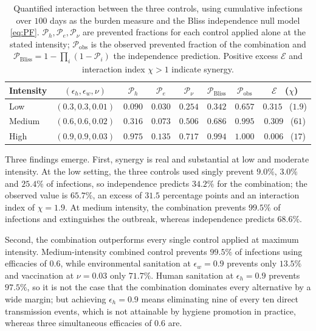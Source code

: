 \documentclass[11pt]{article}
\theoremstyle{plain}
\theoremstyle{definition}
\theoremstyle{remark}
\begin{document}
\begin{table}[!htbp]
\centering
\caption{Quantified interaction between the three controls, using cumulative infections over $100$ days as the burden measure and the Bliss independence null model \eqref{eq:PF}. $\mathcal{P}_h,\mathcal{P}_e,\mathcal{P}_\nu$ are prevented fractions for each control applied alone at the stated intensity; $\mathcal{P}_{\mathrm{obs}}$ is the observed prevented fraction of the combination and $\mathcal{P}_{\mathrm{Bliss}}=1-\prod_i(1-\mathcal{P}_i)$ the independence prediction. Positive excess $\mathcal{E}$ and interaction index $\chi>1$ indicate synergy.}\label{tab:synergy}
\small
\begin{tabular}{@{}lccccccc@{}}
\toprule
Intensity & $(\epsilon_h,\epsilon_w,\nu)$ & $\mathcal{P}_h$ & $\mathcal{P}_e$ & $\mathcal{P}_\nu$ & $\mathcal{P}_{\mathrm{Bliss}}$ & $\mathcal{P}_{\mathrm{obs}}$ & $\mathcal{E}$ \ ($\chi$) \\
\midrule
Low    & $(0.3,0.3,0.01)$ & $0.090$ & $0.030$ & $0.254$ & $0.342$ & $0.657$ & $0.315$ \ ($1.9$) \\
Medium & $(0.6,0.6,0.02)$ & $0.316$ & $0.073$ & $0.506$ & $0.686$ & $0.995$ & $0.309$ \ ($61$) \\
High   & $(0.9,0.9,0.03)$ & $0.975$ & $0.135$ & $0.717$ & $0.994$ & $1.000$ & $0.006$ \ ($17$) \\
\bottomrule
\end{tabular}
\end{table}

Three findings emerge. First, synergy is real and substantial at low and moderate intensity. At the low setting, the three controls used singly prevent $9.0\%$, $3.0\%$ and $25.4\%$ of infections, so independence predicts $34.2\%$ for the combination; the observed value is $65.7\%$, an excess of $31.5$ percentage points and an interaction index of $\chi=1.9$. At medium intensity, the combination prevents $99.5\%$ of infections and extinguishes the outbreak, whereas independence predicts $68.6\%$.

Second, the combination outperforms every single control applied at maximum intensity. Medium-intensity combined control prevents $99.5\%$ of infections using efficacies of $0.6$, while environmental sanitation at $\epsilon_w=0.9$ prevents only $13.5\%$ and vaccination at $\nu=0.03$ only $71.7\%$. Human sanitation at $\epsilon_h=0.9$ prevents $97.5\%$, so it is not the case that the combination dominates every alternative by a wide margin; but achieving $\epsilon_h=0.9$ means eliminating nine of every ten direct transmission events, which is not attainable by hygiene promotion in practice, whereas three simultaneous efficacies of $0.6$ are.
\end{document}
